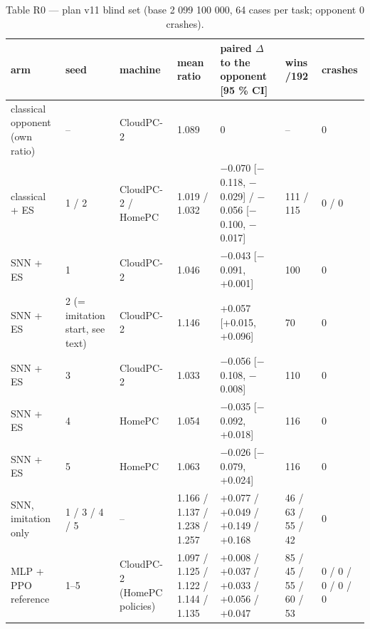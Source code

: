 \documentclass[10pt,a4paper]{article}
\begin{document}
\begin{table}[htbp]\centering\scriptsize
\caption{Table R0 --- plan v11 blind set (base 2 099 100 000, 64 cases per task; opponent 0 crashes).}
\begin{tabularx}{\textwidth}{XXXXXXl}\toprule
arm & seed & machine & mean ratio & paired $\Delta$ to the opponent [95 \% CI] & wins /192 & crashes \\ \midrule
classical opponent (own ratio) & -- & CloudPC-2 & 1.089 & 0 & -- & 0 \\
classical + ES & 1 / 2 & CloudPC-2 / HomePC & 1.019 / 1.032 & $-$0.070 [$-$0.118, $-$0.029] / $-$0.056 [$-$0.100, $-$0.017] & 111 / 115 & 0 / 0 \\
SNN + ES & 1 & CloudPC-2 & 1.046 & $-$0.043 [$-$0.091, +0.001] & 100 & 0 \\
SNN + ES & 2 (= imitation start, see text) & CloudPC-2 & 1.146 & +0.057 [+0.015, +0.096] & 70 & 0 \\
SNN + ES & 3 & CloudPC-2 & 1.033 & $-$0.056 [$-$0.108, $-$0.008] & 110 & 0 \\
SNN + ES & 4 & HomePC & 1.054 & $-$0.035 [$-$0.092, +0.018] & 116 & 0 \\
SNN + ES & 5 & HomePC & 1.063 & $-$0.026 [$-$0.079, +0.024] & 116 & 0 \\
SNN, imitation only & 1 / 3 / 4 / 5 & -- & 1.166 / 1.137 / 1.238 / 1.257 & +0.077 / +0.049 / +0.149 / +0.168 & 46 / 63 / 55 / 42 & 0 \\
MLP + PPO reference & 1--5 & CloudPC-2 (HomePC policies) & 1.097 / 1.125 / 1.122 / 1.144 / 1.135 & +0.008 / +0.037 / +0.033 / +0.056 / +0.047 & 85 / 45 / 55 / 60 / 53 & 0 / 0 / 0 / 0 / 0 \\
\bottomrule\end{tabularx}\end{table}
\end{document}

